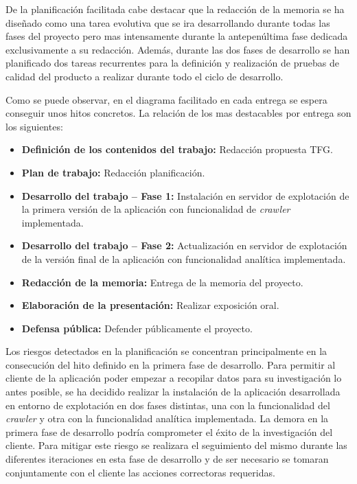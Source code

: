 \documentclass[11pt,a4paper]{article}
\begin{document}
De la planificación facilitada cabe destacar que la redacción de la memoria se ha diseñado como una tarea evolutiva que se ira desarrollando durante todas las fases del proyecto pero mas intensamente durante la antepenúltima fase dedicada exclusivamente a su redacción. Además, durante las dos fases de desarrollo se han planificado dos tareas recurrentes para la definición y realización de pruebas de calidad del producto a realizar durante todo el ciclo de desarrollo.

Como se puede observar, en el diagrama facilitado en cada entrega se espera conseguir unos hitos concretos. La relación de los mas destacables por entrega son los siguientes:

\begin{itemize}
\item \textbf{Definición de los contenidos del trabajo:} Redacción propuesta TFG.
\item \textbf{Plan de trabajo:} Redacción planificación.
\item \textbf{Desarrollo del trabajo – Fase 1:} Instalación en servidor de explotación de la primera versión de la aplicación con funcionalidad de \textit{crawler} implementada.
\item \textbf{Desarrollo del trabajo – Fase 2:} Actualización en servidor de explotación de la versión final de la aplicación con funcionalidad analítica implementada.
\item \textbf{Redacción de la memoria:} Entrega de la memoria del proyecto.
\item \textbf{Elaboración de la presentación:} Realizar exposición oral.
\item \textbf{Defensa pública:} Defender públicamente el proyecto.
\end{itemize}

Los riesgos detectados en la planificación se concentran principalmente en la consecución del hito definido en la primera fase de desarrollo. Para permitir al cliente de la aplicación poder empezar a recopilar datos para su investigación lo antes posible, se ha decidido realizar la instalación de la aplicación desarrollada en entorno de explotación en dos fases distintas, una con la funcionalidad del \textit{crawler} y otra con la funcionalidad analítica implementada. La demora en la primera fase de desarrollo podría comprometer el éxito de la investigación del cliente. Para mitigar este riesgo se realizara el seguimiento del mismo durante las diferentes iteraciones en esta fase de desarrollo y de ser necesario se tomaran conjuntamente con el cliente las acciones correctoras requeridas. 
\end{document}
